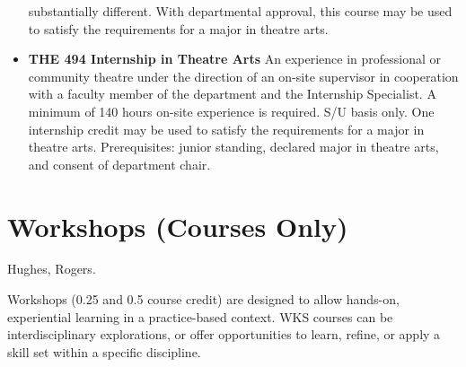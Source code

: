 \documentclass[
  letterpaper,
]{scrbook}
\begin{document}
\begin{itemize}
  substantially different. With departmental approval, this course may
  be used to satisfy the requirements for a major in theatre arts.
\item
  \textbf{THE 494 Internship in Theatre Arts} An experience in
  professional or community theatre under the direction of an on-site
  supervisor in cooperation with a faculty member of the department and
  the Internship Specialist. A minimum of 140 hours on-site experience
  is required. S/U basis only. One internship credit may be used to
  satisfy the requirements for a major in theatre arts. Prerequisites:
  junior standing, declared major in theatre arts, and consent of
  department chair.
\end{itemize}

\section{Workshops (Courses Only)}\label{workshops-courses-only}

Hughes, Rogers.

Workshops (0.25 and 0.5 course credit) are designed to allow hands-on,
experiential learning in a practice-based context. WKS courses can be
interdisciplinary explorations, or offer opportunities to learn, refine,
or apply a skill set within a specific discipline.
\end{document}
